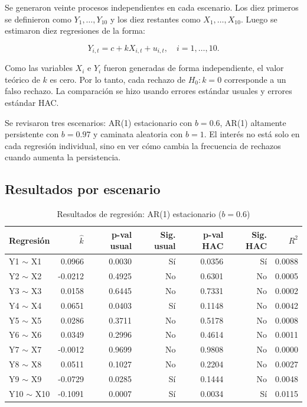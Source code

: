 \documentclass[11pt,letterpaper]{article}
\begin{document}
Se generaron veinte procesos independientes en cada escenario. Los diez primeros se definieron como $Y_1,\dots,Y_{10}$ y los diez restantes como $X_1,\dots,X_{10}$. Luego se estimaron diez regresiones de la forma:

\begin{equation}
Y_{i,t}=c+kX_{i,t}+u_{i,t}, \quad i=1,\dots,10.
\end{equation}

Como las variables $X_i$ e $Y_i$ fueron generadas de forma independiente, el valor teórico de $k$ es cero. Por lo tanto, cada rechazo de $H_0:k=0$ corresponde a un falso rechazo. La comparación se hizo usando errores estándar usuales y errores estándar HAC.

Se revisaron tres escenarios: AR(1) estacionario con $b=0.6$, AR(1) altamente persistente con $b=0.97$ y caminata aleatoria con $b=1$. El interés no está solo en cada regresión individual, sino en ver cómo cambia la frecuencia de rechazos cuando aumenta la persistencia.

\subsection{Resultados por escenario}

\begin{table}[H]
\centering
\caption{Resultados de regresión: AR(1) estacionario ($b=0.6$)}
\scriptsize
\begin{tabular}{lrrrrrr}
\toprule
Regresión & $\hat{k}$ & p-val usual & Sig. usual & p-val HAC & Sig. HAC & $R^2$ \\
\midrule
Y1 $\sim$ X1 & 0.0966 & 0.0030 & Sí & 0.0356 & Sí & 0.0088 \\
Y2 $\sim$ X2 & -0.0212 & 0.4925 & No & 0.6301 & No & 0.0005 \\
Y3 $\sim$ X3 & 0.0158 & 0.6445 & No & 0.7331 & No & 0.0002 \\
Y4 $\sim$ X4 & 0.0651 & 0.0403 & Sí & 0.1148 & No & 0.0042 \\
Y5 $\sim$ X5 & 0.0286 & 0.3711 & No & 0.5178 & No & 0.0008 \\
Y6 $\sim$ X6 & 0.0349 & 0.2996 & No & 0.4614 & No & 0.0011 \\
Y7 $\sim$ X7 & -0.0012 & 0.9699 & No & 0.9808 & No & 0.0000 \\
Y8 $\sim$ X8 & 0.0511 & 0.1027 & No & 0.2204 & No & 0.0027 \\
Y9 $\sim$ X9 & -0.0729 & 0.0285 & Sí & 0.1444 & No & 0.0048 \\
Y10 $\sim$ X10 & -0.1091 & 0.0007 & Sí & 0.0034 & Sí & 0.0115 \\
\bottomrule
\end{tabular}
\end{table}
\end{document}
